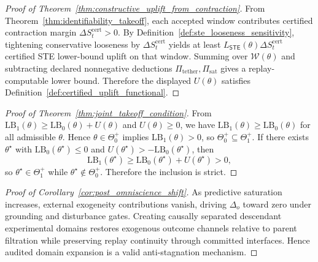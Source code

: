 \documentclass[11pt]{article}
\theoremstyle{definition}
\theoremstyle{plain}
\newcommand{\STE}{\textsf{STE}}
\newcommand{\deltao}{\Delta_o}
\begin{document}
\begin{proof}[Proof of Theorem~\ref{thm:constructive_uplift_from_contraction}]
From Theorem~\ref{thm:identifiability_takeoff}, each accepted window contributes certified contraction margin $\Delta S_t^{\mathrm{cert}}>0$.
By Definition~\ref{def:ste_looseness_sensitivity}, tightening conservative looseness by $\Delta S_t^{\mathrm{cert}}$ yields at least $L_{\STE}(\theta)\Delta S_t^{\mathrm{cert}}$ certified \STE{} lower-bound uplift on that window.
Summing over $\mathcal{W}(\theta)$ and subtracting declared nonnegative deductions $\Pi_{\mathrm{tether}},\Pi_{\mathrm{sat}}$ gives a replay-computable lower bound.
Therefore the displayed $U(\theta)$ satisfies Definition~\ref{def:certified_uplift_functional}.
\end{proof}

\begin{proof}[Proof of Theorem~\ref{thm:joint_takeoff_condition}]
From $\mathrm{LB}_1(\theta)\ge \mathrm{LB}_0(\theta)+U(\theta)$ and $U(\theta)\ge 0$, we have $\mathrm{LB}_1(\theta)\ge \mathrm{LB}_0(\theta)$ for all admissible $\theta$.
Hence $\theta\in\Theta_0^+$ implies $\mathrm{LB}_1(\theta)>0$, so $\Theta_0^+\subseteq\Theta_1^+$.
If there exists $\theta^\star$ with $\mathrm{LB}_0(\theta^\star)\le 0$ and $U(\theta^\star)>-\mathrm{LB}_0(\theta^\star)$, then
\[
\mathrm{LB}_1(\theta^\star)\ge \mathrm{LB}_0(\theta^\star)+U(\theta^\star)>0,
\]
so $\theta^\star\in\Theta_1^+$ while $\theta^\star\notin\Theta_0^+$.
Therefore the inclusion is strict.
\end{proof}

\begin{proof}[Proof of Corollary~\ref{cor:post_omniscience_shift}]
As predictive saturation increases, external exogeneity contributions vanish, driving $\deltao$ toward zero under grounding and disturbance gates.
Creating causally separated descendant experimental domains restores exogenous outcome channels relative to parent filtration while preserving replay continuity through committed interfaces.
Hence audited domain expansion is a valid anti-stagnation mechanism.
\end{proof}
\end{document}
